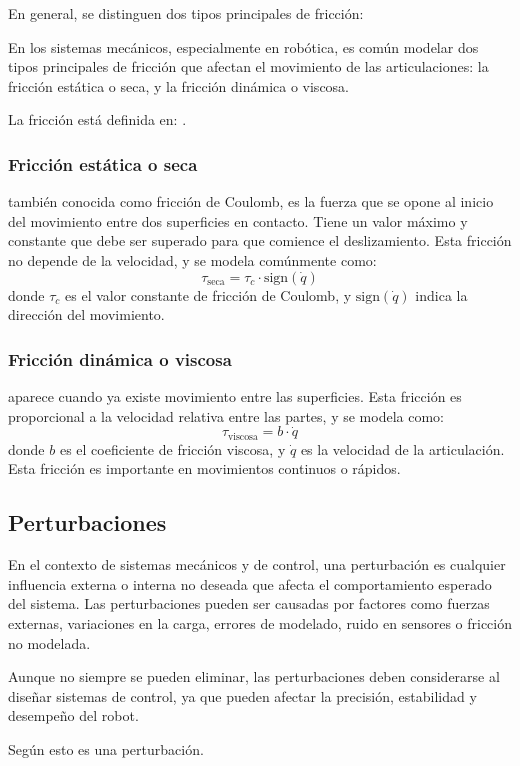 En general, se distinguen dos tipos principales de fricción:


En los sistemas mecánicos, especialmente en robótica, es común modelar dos tipos principales de fricción que afectan el movimiento de las articulaciones: la fricción estática o seca, y la fricción dinámica o viscosa.

La fricción está definida en: \cite{modernRoboticsFriction}.

\subsubsection{Fricción estática o seca}

también conocida como fricción de Coulomb, es la fuerza que se opone al inicio del movimiento entre dos superficies en contacto. Tiene un valor máximo y constante que debe ser superado para que comience el deslizamiento. Esta fricción no depende de la velocidad, y se modela comúnmente como:
\[
\tau_{\text{seca}} = \tau_c \cdot \text{sign}(\dot{q})
\]
donde \( \tau_c \) es el valor constante de fricción de Coulomb, y \( \text{sign}(\dot{q}) \) indica la dirección del movimiento.

\subsubsection{Fricción dinámica o viscosa}


aparece cuando ya existe movimiento entre las superficies. Esta fricción es proporcional a la velocidad relativa entre las partes, y se modela como:
\[
\tau_{\text{viscosa}} = b \cdot \dot{q}
\]
donde \( b \) es el coeficiente de fricción viscosa, y \( \dot{q} \) es la velocidad de la articulación. Esta fricción es importante en movimientos continuos o rápidos.


\subsection{Perturbaciones}

En el contexto de sistemas mecánicos y de control, una perturbación es cualquier influencia externa o interna no deseada que afecta el comportamiento esperado del sistema. Las perturbaciones pueden ser causadas por factores como fuerzas externas, variaciones en la carga, errores de modelado, ruido en sensores o fricción no modelada.

Aunque no siempre se pueden eliminar, las perturbaciones deben considerarse al diseñar sistemas de control, ya que pueden afectar la precisión, estabilidad y desempeño del robot.

Según \cite{makinandoPerturbaciones} esto es una perturbación.
